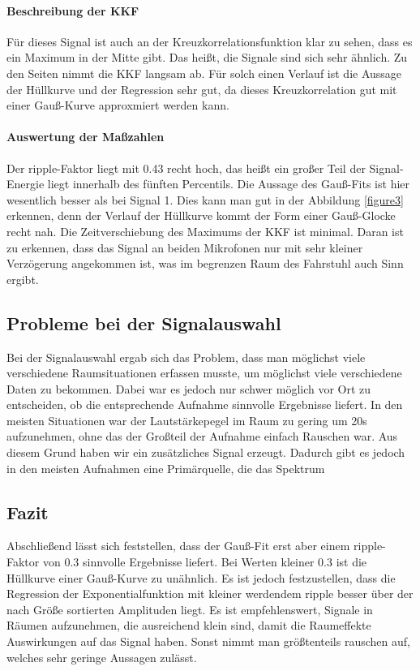 \paragraph{Beschreibung der KKF}
Für dieses Signal ist auch an der Kreuzkorrelationsfunktion klar zu sehen, dass es ein Maximum in der Mitte gibt. Das heißt, die Signale sind sich sehr ähnlich. Zu den Seiten nimmt die KKF langsam ab. Für solch einen Verlauf ist die Aussage der Hüllkurve und der Regression sehr gut, da dieses Kreuzkorrelation gut mit einer Gauß-Kurve approxmiert werden kann.
\paragraph{Auswertung der Maßzahlen}
Der ripple-Faktor liegt mit 0.43 recht hoch, das heißt ein großer Teil der Signal-Energie liegt innerhalb des fünften Percentils. Die Aussage des Gauß-Fits ist hier wesentlich besser als bei Signal 1. Dies kann man gut in der Abbildung \ref{figure3} erkennen, denn der Verlauf der Hüllkurve kommt der Form einer Gauß-Glocke recht nah. Die Zeitverschiebung des Maximums der KKF ist minimal. Daran ist zu erkennen, dass das Signal an beiden Mikrofonen nur mit sehr kleiner Verzögerung angekommen ist, was im begrenzen Raum des Fahrstuhl auch Sinn ergibt.

\subsection{Probleme bei der Signalauswahl}
Bei der Signalauswahl ergab sich das Problem, dass man möglichst viele verschiedene Raumsituationen erfassen musste, um möglichst viele verschiedene Daten zu bekommen. Dabei war es jedoch nur schwer möglich vor Ort zu entscheiden, ob die entsprechende Aufnahme sinnvolle Ergebnisse liefert.
In den meisten Situationen war der Lautstärkepegel im Raum zu gering um 20s aufzunehmen, ohne das der Großteil der Aufnahme einfach Rauschen war. Aus diesem Grund haben wir ein zusätzliches Signal erzeugt. Dadurch gibt es jedoch in den meisten Aufnahmen eine Primärquelle, die das Spektrum 

\subsection{Fazit}
Abschließend lässt sich feststellen, dass der Gauß-Fit erst aber einem ripple-Faktor von 0.3 sinnvolle Ergebnisse liefert. Bei Werten kleiner 0.3 ist die Hüllkurve einer Gauß-Kurve zu unähnlich. Es ist jedoch festzustellen, dass die Regression der Exponentialfunktion mit kleiner werdendem ripple besser über der nach Größe sortierten Amplituden liegt.
Es ist empfehlenswert, Signale in Räumen aufzunehmen, die ausreichend klein sind, damit die Raumeffekte Auswirkungen auf das Signal haben. Sonst nimmt man größtenteils rauschen auf, welches sehr geringe Aussagen zulässt.
